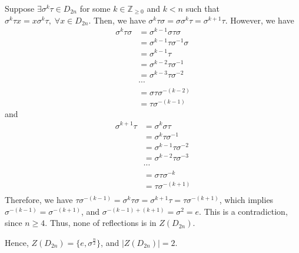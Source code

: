 \begin{answer}
    Suppose $\exists \sigma^k\tau \in D_{2n}$ for some $k \in \mathbb{Z}_{\geq 0}$ and $k < n$ such that $\sigma^k\tau x = x \sigma^k\tau, \; \forall x \in D_{2n}$. Then, we have $\sigma^k\tau\sigma = \sigma\sigma^k\tau = \sigma^{k+1}\tau$. However, we have
        \begin{equation}
            \begin{aligned}
                \sigma^k\tau\sigma &= \sigma^{k-1}\sigma\tau\sigma\\
                &= \sigma^{k-1}\tau\sigma^{-1}\sigma\\
                &= \sigma^{k-1}\tau\\
                &= \sigma^{k-2}\tau\sigma^{-1}\\
                &= \sigma^{k-3}\tau\sigma^{-2}\\
                &\cdots\\
                &= \sigma\tau\sigma^{-(k-2)}\\
                &= \tau\sigma^{-(k-1)}
            \end{aligned}
        \end{equation}
        and 
        \begin{equation}
            \begin{aligned}
                \sigma^{k+1}\tau &= \sigma^k\sigma\tau\\
                &= \sigma^k\tau\sigma^{-1}\\
                &= \sigma^{k-1}\tau\sigma^{-2}\\
                &= \sigma^{k-2}\tau\sigma^{-3}\\
                &\cdots\\
                &= \sigma\tau\sigma^{-k}\\
                &= \tau\sigma^{-(k+1)}\\
            \end{aligned}
        \end{equation}
        Therefore, we have $\tau\sigma^{-(k-1)} = \sigma^k\tau\sigma = \sigma^{k+1}\tau = \tau\sigma^{-(k+1)}$, which implies $\sigma^{-(k-1)} = \sigma^{-(k+1)}$, and $\sigma^{-(k-1)+(k+1)} = \sigma^2 = e$. This is a contradiction, since $n \geq 4$. Thus, none of reflections is in $Z(D_{2n})$.
        
        Hence, $Z(D_{2n}) = \{e,\sigma^{\tfrac{n}{2}}\}$, and $\lvert Z(D_{2n})\rvert = 2$.
\end{answer}